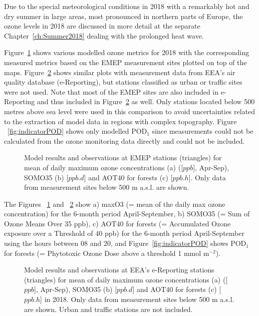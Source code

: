 Due to the special meteorological conditions in 2018 with a remarkably hot and dry summer in large areas, most pronounced in northern parts of Europe, the ozone levels in 2018 are discussed in more detail at the separate Chapter~\ref{ch:Summer2018} dealing with the prolonged heat wave.

Figure~\ref{fig:indicators_emep} shows various modelled ozone metrics for 2018 with the corresponding measured metrics based on the EMEP measurement sites plotted on top of the maps. Figure~\ref{fig:indicators_airbase} shows similar plots with measurement data from EEA's air quality database (e-Reporting), but stations classified as urban or traffic sites were not used. Note that most of the EMEP sites are also included in e-Reporting and thus included in Figure~\ref{fig:indicators_airbase} as well. Only stations located below 500 metres above sea level were used in this comparison to avoid uncertainties related to the extraction of model data in regions with complex topography. Figure
~\ref{fig:indicatorPOD} shows only modelled POD$_1$ since measurements could not be calculated from the ozone monitoring data directly and could not be included.

\begin{figure}[H]
  \centering
\caption{Model results and observations at EMEP stations (triangles) for mean of daily maximum ozone concentrations (a) ([$ppb$], Apr-Sep), SOMO35 (b) [$ppb.d$] and AOT40 for forests (c) [$ppb.h$]. Only data from measurement sites below 500 m a.s.l. are shown.}
\label{fig:indicators_emep}
\end{figure}

The Figures ~\ref{fig:indicators_emep} and ~\ref{fig:indicators_airbase} show a) maxO3 (= mean of the daily max ozone concentration) for the 6-month period April-September, b) SOMO35 (= Sum of Ozone Means Over 35 ppb), c) AOT40 for forests (= Accumulated Ozone exposure over a Threshold of 40 ppb) for the 6-month period April-September using the hours between 08 and 20, and Figure~\ref{fig:indicatorPOD} shows POD$_1$ for forests (= Phytotoxic Ozone Dose above a threshold 1 mmol m$^{-2}$). 

\begin{figure}[H]
  \centering
\caption{Model results and observations at EEA's e-Reporting stations (triangles) for mean of daily maximum ozone concentrations (a) ([$ppb$], Apr-Sep), SOMO35 (b) [$ppb.d$] and AOT40 for forests (c) [$ppb.h$] in 2018. Only data from measurement sites below 500 m a.s.l. are shown. Urban and traffic stations are not included.}
\label{fig:indicators_airbase}
\end{figure}

